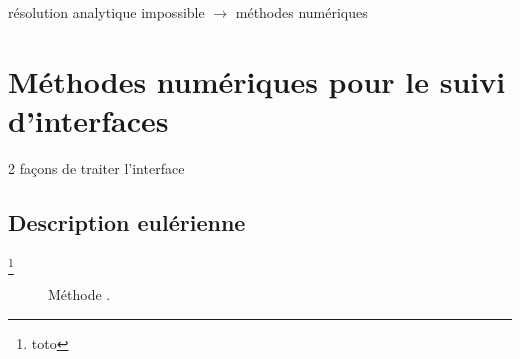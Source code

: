 

\par
résolution analytique impossible $\to$ méthodes numériques

\section{Méthodes numériques pour le suivi d'interfaces}
2 façons de traiter l'interface
\subsection{Description eulérienne}
\footnote{toto}
\begin{figure}
	\centering
%	
	\caption{Méthode .}
	\label{fig:levelset}
\end{figure}

